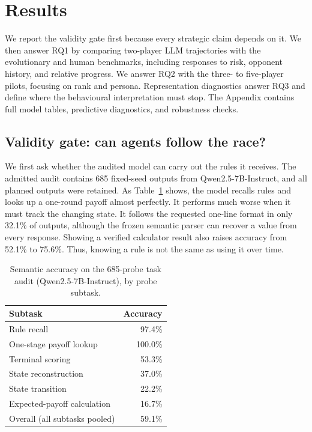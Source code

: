 \documentclass[sigconf]{aamas}
\begin{document}
\section{Results}
\label{sec:results}

We report the validity gate first because every strategic claim depends on it.
We then answer RQ1 by comparing two-player LLM trajectories with the
evolutionary and human benchmarks, including responses to risk, opponent
history, and relative progress. We answer RQ2 with the three- to five-player
pilots, focusing on rank and persona. Representation diagnostics answer RQ3
and define where the behavioural interpretation must stop. The Appendix
contains full model tables, predictive diagnostics, and robustness checks.

\subsection{Validity gate: can agents follow the race?}
\label{sec:results-validity}

We first ask whether the audited model can carry out the rules it receives.
The admitted audit contains 685 fixed-seed outputs from
Qwen2.5-7B-Instruct, and all planned outputs were retained. As
Table~\ref{tab:task-audit} shows, the model recalls rules and looks up a
one-round payoff almost perfectly. It performs much worse when it must track
the changing state. It follows the requested one-line format in only 32.1\%
of outputs, although the frozen semantic parser can recover a value from
every response. Showing a verified calculator result also raises accuracy
from 52.1\% to 75.6\%. Thus, knowing a rule is not the same as using it over
time.

\begin{table}[t]
    \caption{Semantic accuracy on the 685-probe task audit
    (Qwen2.5-7B-Instruct), by probe subtask.}
    \label{tab:task-audit}
    \centering
    \small
    \begin{tabular}{@{}lr@{}}
        \toprule
        Subtask & Accuracy \\
        \midrule
        Rule recall                  & 97.4\%  \\
        One-stage payoff lookup      & 100.0\% \\
        Terminal scoring             & 53.3\%  \\
        State reconstruction         & 37.0\%  \\
        State transition             & 22.2\%  \\
        Expected-payoff calculation  & 16.7\%  \\
        \midrule
        Overall (all subtasks pooled) & 59.1\% \\
        \bottomrule
    \end{tabular}
\end{table}
\end{document}
